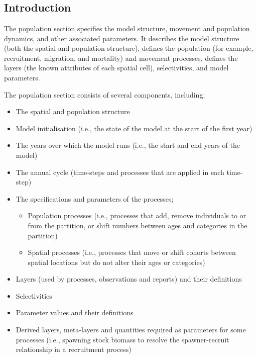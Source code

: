 \section{\label{sec:population-section}}

\subsection{Introduction}

The population section specifies the model structure, movement and population dynamics, and other associated parameters. It describes the model structure (both the spatial and population structure), defines the population  (for example, recruitment, migration, and mortality) and movement processes, defines the layers (the known attributes of each spatial cell), selectivities, and model parameters.

The population section consists of several components, including;
\begin{itemize}
  \item The spatial and population structure
  \item Model initialisation (i.e., the state of the model at the start of the first year)
  \item The years over which the model runs (i.e., the start and end years of the model)
  \item The annual cycle (time-steps and processes that are applied in each time-step)
  \item The specifications and parameters of the processes;
  \begin{itemize}
    \item Population processes (i.e., processes that add, remove individuals to or from the partition, or shift numbers between ages and categories in the partition)
    \item Spatial processes (i.e., processes that move or shift cohorts between spatial locations but do not alter their ages or categories)
  \end{itemize}
  \item Layers (used by processes, observations and reports) and their definitions
  \item Selectivities
  \item Parameter values and their definitions
  \item Derived layers, meta-layers and quantities required as parameters for some processes (i.e., spawning stock biomass to resolve the spawner-recruit relationship in a recruitment process)
\end{itemize}

